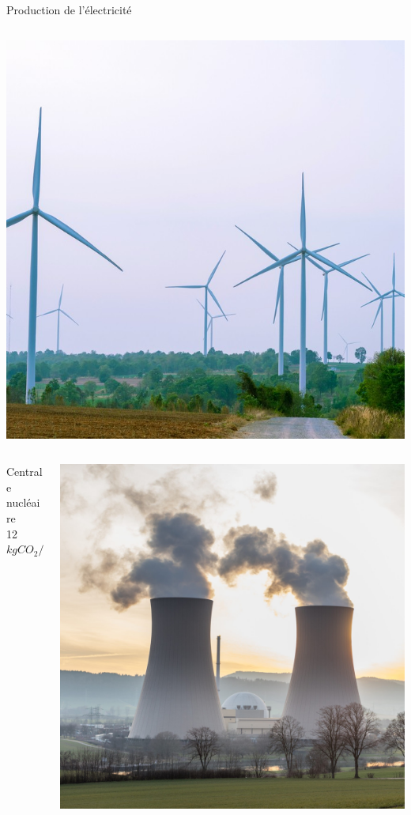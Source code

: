 \documentclass{beamer}
\begin{document}
\begin{frame}{Production de l'électricité}
\begin{columns}
\begin{column}{0.2\textwidth}
  \includegraphics[scale=0.12]{images/eolienne.jpg}
\end{column}
\end{columns}
\vspace{0.3cm}
\begin{columns}
  \begin{column}{0.26\textwidth}
Centrale nucléaire\\
12 $kgCO_2/MWh$
\end{column}
\begin{column}{0.2\textwidth}
  \includegraphics[scale=0.04]{images/centrale_nucleaire.jpg}

\end{column}
\end{columns}
\end{frame}
\end{document}
